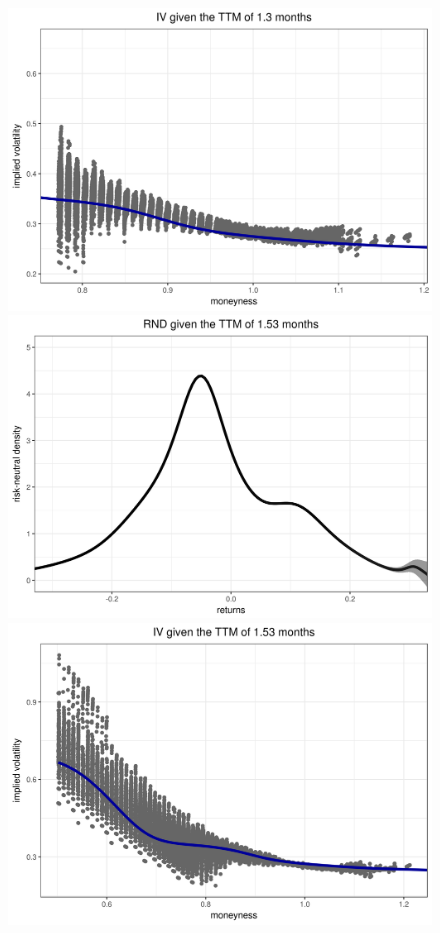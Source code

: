 \documentclass[a4paper,12pt]{article}
\theoremstyle{plain}
\theoremstyle{definition}
\begin{document}
\begin{figure}[H]
\begin{center}
 \endminipage
 \hspace{3mm}
 \includegraphics[width=\linewidth]{figures/hour_5th/GOOG_20150105_iv_smile_5th_hour_ttm_1_3.png}
 \endminipage\\
 \includegraphics[width=\linewidth]{figures/hour_5th/GOOG_20150105_rnd_ci_5th_hour_ttm_1_53.png}
 \endminipage
 \hspace{3mm}
 \includegraphics[width=\linewidth]{figures/hour_5th/GOOG_20150105_iv_smile_5th_hour_ttm_1_53.png}

\end{center}
\end{figure}
\end{document}
